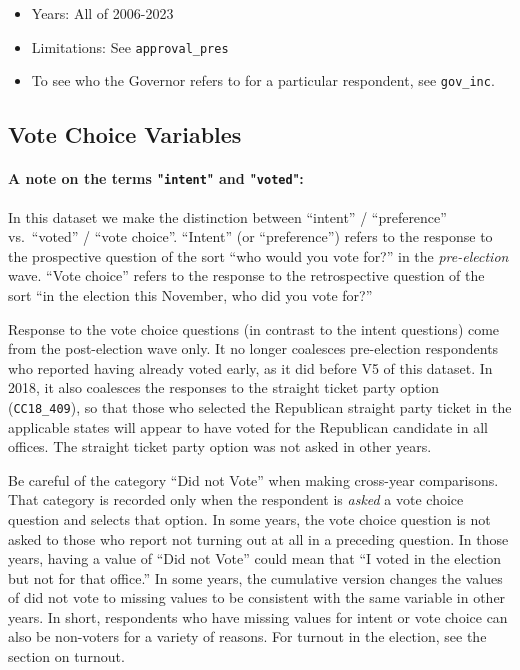 \documentclass[10pt,article,oneside]{memoir}
\theoremstyle{definition}
\begin{document}
\begin{itemize}
\tightlist
\item
  Years: All of 2006-2023
\item
  Limitations: See \texttt{approval\_pres}
\item
  To see who the Governor refers to for a particular respondent, see
  \texttt{gov\_inc}.
\end{itemize}

\newpage

\subsection{Vote Choice Variables}\label{vote-choice-variables}

\paragraph{A note on the terms "\texttt{intent}" and "\texttt{voted}":}

In this dataset we make the distinction between ``intent'' /
``preference'' vs.~``voted'' / ``vote choice''. ``Intent'' (or
``preference'') refers to the response to the prospective question of
the sort ``who would you vote for?'' in the \emph{pre-election} wave.
``Vote choice'' refers to the response to the retrospective question of
the sort ``in the election this November, who did you vote for?''

Response to the vote choice questions (in contrast to the intent
questions) come from the post-election wave only. It no longer coalesces
pre-election respondents who reported having already voted early, as it
did before V5 of this dataset. In 2018, it also coalesces the responses
to the straight ticket party option (\texttt{CC18\_409}), so that those
who selected the Republican straight party ticket in the applicable
states will appear to have voted for the Republican candidate in all
offices. The straight ticket party option was not asked in other years.

Be careful of the category ``Did not Vote'' when making cross-year
comparisons. That category is recorded only when the respondent is
\emph{asked} a vote choice question and selects that option. In some
years, the vote choice question is not asked to those who report not
turning out at all in a preceding question. In those years, having a
value of ``Did not Vote'' could mean that ``I voted in the election but
not for that office.'' In some years, the cumulative version changes the
values of did not vote to missing values to be consistent with the same
variable in other years. In short, respondents who have missing values
for intent or vote choice can also be non-voters for a variety of
reasons. For turnout in the election, see the section on turnout.
\end{document}
